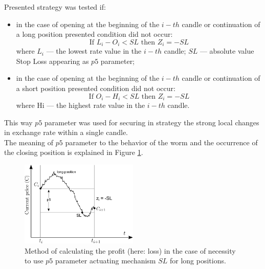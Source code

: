 \documentclass[runningheads,a4paper]{llncs}
\begin{document}
\noindent Presented strategy was tested if:
\begin{itemize}
\item in the case of opening at the beginning of the $i-th$ candle or continuation of a long position presented condition did not occur:\\
\begin{equation}
\text{If } L_i-O_i<SL \text{ then } Z_i=-SL
\end{equation}
where $L_i$ --– the lowest rate value in the $i-th$ candle; $SL$ --– absolute value Stop Loss appearing as $p5$ parameter;
\item in the case of opening at the beginning of the $i-th$ candle or continuation of a short position presented condition did not occur:
\begin{equation}
\text{If } O_i-H_i<SL \text{ then } Z_i=-SL
\end{equation}
where Hi --– the highest rate value in the $i-th$ candle.
\end{itemize}
This way $p5$ parameter was used for securing in strategy the strong local changes in exchange rate within a single candle.\\
The meaning of $p5$ parameter to the behavior of the worm and the occurrence of the closing position is explained in Figure \ref{fig:fig5}.
\begin{figure}[h!]
\centering
\includegraphics[width = 0.5\textwidth]{figures/rys5.png}
\caption{Method of calculating the profit (here: loss) in the case of necessity to use $p5$ parameter actuating mechanism $SL$ for long positions.}
\label{fig:fig5}
\end{figure}
\FloatBarrier
\end{document}
